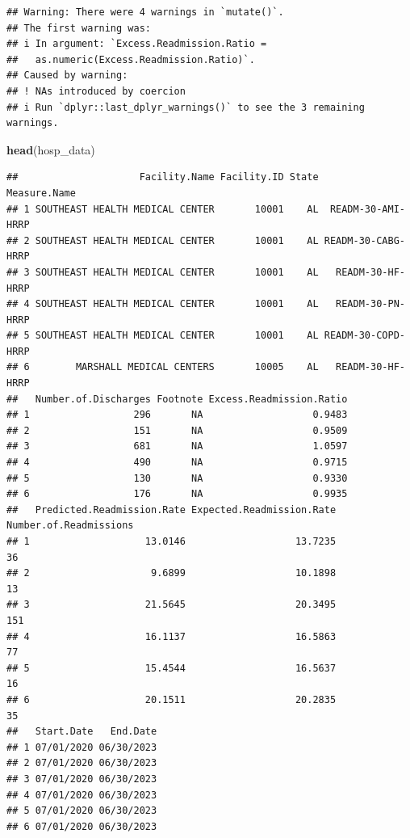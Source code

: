\documentclass[
]{article}
\newenvironment{Shaded}{\begin{snugshade}}{\end{snugshade}}
\newcommand{\FunctionTok}[1]{\textcolor[rgb]{0.13,0.29,0.53}{\textbf{#1}}}
\newcommand{\NormalTok}[1]{#1}
\begin{document}
\begin{verbatim}
## Warning: There were 4 warnings in `mutate()`.
## The first warning was:
## i In argument: `Excess.Readmission.Ratio =
##   as.numeric(Excess.Readmission.Ratio)`.
## Caused by warning:
## ! NAs introduced by coercion
## i Run `dplyr::last_dplyr_warnings()` to see the 3 remaining warnings.
\end{verbatim}

\begin{Shaded}
\begin{Highlighting}[]
\FunctionTok{head}\NormalTok{(hosp\_data)}
\end{Highlighting}
\end{Shaded}

\begin{verbatim}
##                     Facility.Name Facility.ID State       Measure.Name
## 1 SOUTHEAST HEALTH MEDICAL CENTER       10001    AL  READM-30-AMI-HRRP
## 2 SOUTHEAST HEALTH MEDICAL CENTER       10001    AL READM-30-CABG-HRRP
## 3 SOUTHEAST HEALTH MEDICAL CENTER       10001    AL   READM-30-HF-HRRP
## 4 SOUTHEAST HEALTH MEDICAL CENTER       10001    AL   READM-30-PN-HRRP
## 5 SOUTHEAST HEALTH MEDICAL CENTER       10001    AL READM-30-COPD-HRRP
## 6        MARSHALL MEDICAL CENTERS       10005    AL   READM-30-HF-HRRP
##   Number.of.Discharges Footnote Excess.Readmission.Ratio
## 1                  296       NA                   0.9483
## 2                  151       NA                   0.9509
## 3                  681       NA                   1.0597
## 4                  490       NA                   0.9715
## 5                  130       NA                   0.9330
## 6                  176       NA                   0.9935
##   Predicted.Readmission.Rate Expected.Readmission.Rate Number.of.Readmissions
## 1                    13.0146                   13.7235                     36
## 2                     9.6899                   10.1898                     13
## 3                    21.5645                   20.3495                    151
## 4                    16.1137                   16.5863                     77
## 5                    15.4544                   16.5637                     16
## 6                    20.1511                   20.2835                     35
##   Start.Date   End.Date
## 1 07/01/2020 06/30/2023
## 2 07/01/2020 06/30/2023
## 3 07/01/2020 06/30/2023
## 4 07/01/2020 06/30/2023
## 5 07/01/2020 06/30/2023
## 6 07/01/2020 06/30/2023
\end{verbatim}
\end{document}
